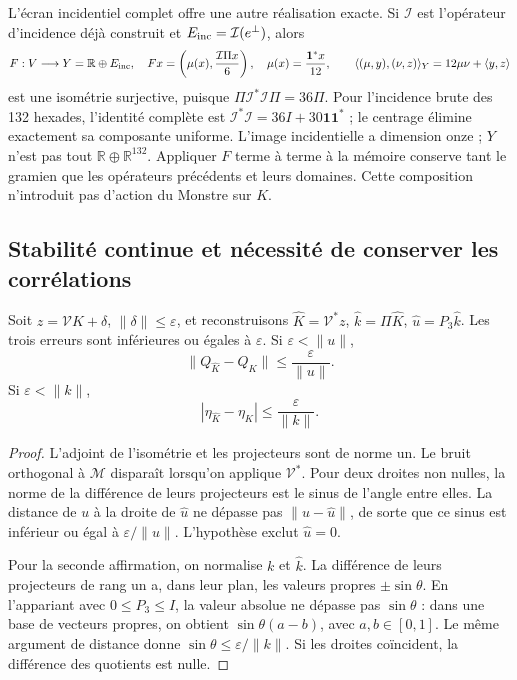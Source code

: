 L’écran incidentiel complet offre une autre réalisation exacte. Si
\(\mathcal I\) est l’opérateur d’incidence déjà construit et
\(E_{\rm inc}=\mathcal I(e^\perp)\), alors
\begin{equation}
 F:V\longrightarrow Y=\mathbb R\oplus E_{\rm inc},\quad
 Fx=\left(\mu(x),\frac{\mathcal I\Pi x}{6}\right),\quad
 \mu(x)=\frac{\mathbf1^*x}{12},\qquad
 \langle(\mu,y),(\nu,z)\rangle_Y=12\mu\nu+\langle y,z\rangle
 \label{lib01:incidencia-F}
\end{equation}
est une isométrie surjective, puisque
\(\Pi\mathcal I^*\mathcal I\Pi=36\Pi\). Pour l’incidence
brute des 132 hexades, l’identité complète est
\(\mathcal I^*\mathcal I=36I+30\mathbf1\mathbf1^*\) ; le
centrage élimine exactement sa composante uniforme. L’image incidentielle a
dimension onze ; \(Y\) n’est pas tout \(\mathbb R\oplus\mathbb R^{132}\).
Appliquer \(F\) terme à terme à la mémoire conserve tant le gramien
que les opérateurs précédents et leurs domaines. Cette
composition n’introduit pas d’action du Monstre sur \(K\).

\subsection{Stabilité continue et nécessité de conserver les corrélations}
\label{lib01:ruido}

\begin{theorem}
\label{lib01:error-proyectores}
Soit \(z=\mathcal VK+\delta\), \(\|\delta\|\leq\varepsilon\), et reconstruisons \(\widehat K=\mathcal V^*z\), \(\widehat k=\Pi\widehat K\), \(\widehat u=P_3\widehat k\). Les trois erreurs sont inférieures ou égales à \(\varepsilon\). Si \(\varepsilon<\|u\|\),
\[
 \|Q_{\widehat K}-Q_K\|\leq\frac\varepsilon{\|u\|}.
\]
Si \(\varepsilon<\|k\|\),
\[
 |\eta_{\widehat K}-\eta_K|\leq\frac\varepsilon{\|k\|}.
\]
\end{theorem}
\begin{proof}
L’adjoint de l’isométrie et les projecteurs sont de norme un. Le bruit
orthogonal à \(\mathcal M\) disparaît lorsqu’on applique \(\mathcal V^*\).
Pour deux droites non nulles, la norme de la différence de leurs projecteurs est
le sinus de l’angle entre elles. La distance de \(u\) à la droite de
\(\widehat u\) ne dépasse pas \(\|u-\widehat u\|\), de sorte que ce
sinus est inférieur ou égal à \(\varepsilon/\|u\|\). L’hypothèse
exclut \(\widehat u=0\).

Pour la seconde affirmation, on normalise \(k\) et \(\widehat k\). La différence de leurs projecteurs de rang un a, dans leur plan, les valeurs propres \(\pm\sin\theta\). En l'appariant avec \(0\leq P_3\leq I\), la valeur absolue ne dépasse pas \(\sin\theta\) : dans une base de vecteurs propres, on obtient \(\sin\theta(a-b)\), avec \(a,b\in[0,1]\). Le même argument de distance donne \(\sin\theta\leq\varepsilon/\|k\|\). Si les droites coïncident, la différence des quotients est nulle.
\end{proof}

